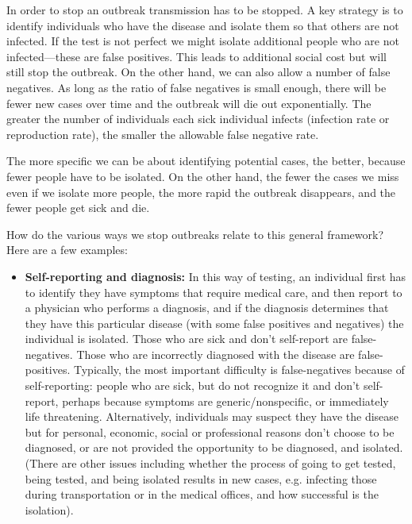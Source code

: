 \documentclass[onecolumn,journal]{IEEEtran}
\begin{document}
\begin{multicols}{2}

In order to stop an outbreak transmission has to be stopped. A key strategy is to identify individuals who have the disease and isolate them so that others are not infected. %
If the test is not perfect we might isolate additional people who are not infected---these are false positives. This leads to additional social cost but will still stop the outbreak. On the other hand, we can also allow a number of false negatives. As long as the ratio of false negatives is small enough, there will be fewer new cases over time and the outbreak will die out exponentially. The greater the number of individuals each sick individual infects (infection rate or reproduction rate), the smaller the allowable false negative rate.

The more specific we can be about identifying potential cases, the better, because fewer people have to be isolated. On the other hand, the fewer the cases we miss even if we isolate more people, the more rapid the outbreak disappears, and the fewer people get sick and die. 

How do the various ways we stop outbreaks relate to this general framework? Here are a few examples:
\begin{itemize}
\item \textbf{Self-reporting and diagnosis:} In this way of testing, an individual first has to identify they have symptoms that require medical care, and then report to a physician who performs a diagnosis, and if the diagnosis determines that they have this particular disease (with some false positives and negatives) the individual is isolated. Those who are sick and don't self-report are false-negatives. Those who are incorrectly diagnosed with the disease are false-positives. Typically, the most important difficulty is false-negatives because of self-reporting: people who are sick, but do not recognize it and don't self-report, perhaps because symptoms are generic/nonspecific, or immediately life threatening. Alternatively, individuals may suspect they have the disease but for personal, economic, social or professional reasons don't choose to be diagnosed, or are not provided the opportunity to be diagnosed, and isolated. (There are other issues including whether the process of going to get tested, being tested, and being isolated results in new cases, e.g. infecting those during transportation or in the medical offices, and how successful is the isolation). 


\end{itemize}
\end{multicols}
\end{document}
